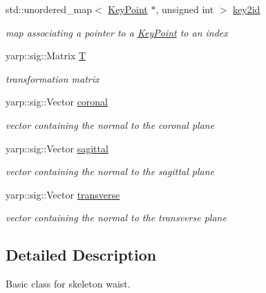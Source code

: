 \begin{DoxyCompactItemize}
\mbox{\label{classassistive__rehab_1_1Skeleton_a4b1c3607cabb58053e4c367015e98e28}} 
std\+::unordered\+\_\+map$<$ \mbox{\hyperlink{classassistive__rehab_1_1KeyPoint}{Key\+Point}} $\ast$, unsigned int $>$ \mbox{\hyperlink{classassistive__rehab_1_1Skeleton_a4b1c3607cabb58053e4c367015e98e28}{key2id}}
\begin{DoxyCompactList}\small\item\em map associating a pointer to a \mbox{\hyperlink{classassistive__rehab_1_1KeyPoint}{Key\+Point}} to an index \end{DoxyCompactList}\item 
\mbox{\label{classassistive__rehab_1_1Skeleton_a358a1c5eb23a562f8558ff8d43583ef7}} 
yarp\+::sig\+::\+Matrix \mbox{\hyperlink{classassistive__rehab_1_1Skeleton_a358a1c5eb23a562f8558ff8d43583ef7}{T}}
\begin{DoxyCompactList}\small\item\em transformation matrix \end{DoxyCompactList}\item 
\mbox{\label{classassistive__rehab_1_1Skeleton_ad042a7e60e6d72cc87b06c5fb0bdfae2}} 
yarp\+::sig\+::\+Vector \mbox{\hyperlink{classassistive__rehab_1_1Skeleton_ad042a7e60e6d72cc87b06c5fb0bdfae2}{coronal}}
\begin{DoxyCompactList}\small\item\em vector containing the normal to the coronal plane \end{DoxyCompactList}\item 
\mbox{\label{classassistive__rehab_1_1Skeleton_a72d6ccb619619e77a17258b08496a972}} 
yarp\+::sig\+::\+Vector \mbox{\hyperlink{classassistive__rehab_1_1Skeleton_a72d6ccb619619e77a17258b08496a972}{sagittal}}
\begin{DoxyCompactList}\small\item\em vector containing the normal to the sagittal plane \end{DoxyCompactList}\item 
\mbox{\label{classassistive__rehab_1_1Skeleton_ab8a9bf9297f520e8de801248e0b8d2dd}} 
yarp\+::sig\+::\+Vector \mbox{\hyperlink{classassistive__rehab_1_1Skeleton_ab8a9bf9297f520e8de801248e0b8d2dd}{transverse}}
\begin{DoxyCompactList}\small\item\em vector containing the normal to the transverse plane \end{DoxyCompactList}\end{DoxyCompactItemize}


\subsection{Detailed Description}
Basic class for skeleton waist. 

